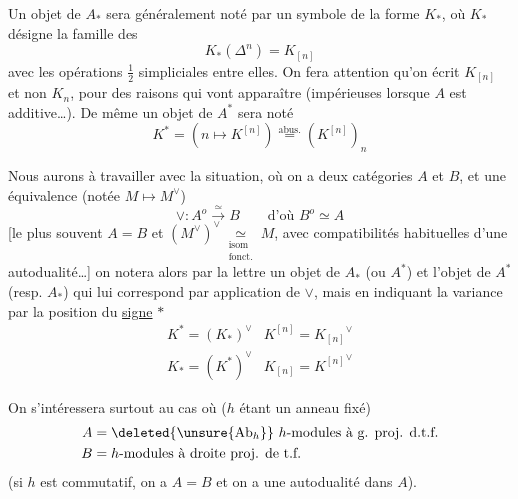Un objet de $A_*$ sera généralement noté par un symbole de la forme $K_*$, où $K_*$ désigne la famille des
\[ K_*(\Delta^n)=K_{[n]} \]
avec les opérations $\tfrac12$ simpliciales entre elles.
On fera attention qu'on écrit $K_{[n]}$ et non $K_n$, pour des raisons qui vont apparaître (impérieuses lorsque $A$ est additive\ldots).
De même un objet de $A^*$ sera noté
\[ K^*=(n\longmapsto K^{[n]})\overset{\text{abus.}}{=}(K^{[n]})_n \]

Nous aurons à travailler avec la situation, où on a deux catégories $A$ et $B$, et une équivalence (notée \deleted{$\unsure{\vee^*}$} $M\mapsto M^\vee$)
\[ \vee:A^o\overset\simeq\longrightarrow B\qquad\text{d'où }B^o\simeq A \]
[le plus souvent $A=B$ et $(M^\vee)^\vee\underset{\substack{\text{isom}\\\text{fonct.}}}{\simeq}M$, avec compatibilités habituelles d'une autodualité\ldots]
on notera alors  par la  lettre un objet de $A_*$ (ou $A^*$) et l'objet de $A^*$ (resp. $A_*$) qui lui correspond par application de $\vee$, mais en indiquant la variance par la position du \uline{signe} $*$
\[
\begin{array}{ll}
K^*=(K_*)^\vee&K^{[n]}={K_{[n]}}^\vee\\
K_*=(K^*)^\vee&K_{[n]}={K^{[n]}}^\vee
\end{array}
\]

On s'intéressera surtout au cas où ($h$ étant un anneau fixé) 
\[
\begin{aligned}
A&=\deleted{\unsure{\mathrm{Ab}_h}}\ h\text{-modules à g. proj. d.t.f.}\\
B&=h\text{-modules à droite proj. de t.f.}
\end{aligned}
\]
(si $h$ est commutatif, on a $A=B$ et on a une autodualité dans $A$).

